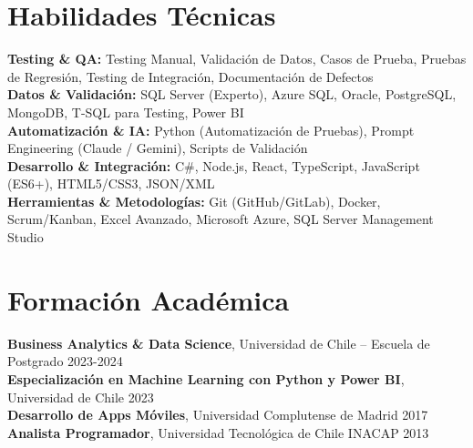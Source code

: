 \documentclass[11pt,letterpaper]{article}
\begin{document}
\section{Habilidades T\'{e}cnicas}
\textbf{Testing \& QA:} Testing Manual, Validación de Datos, Casos de Prueba, Pruebas de Regresión, Testing de Integración, Documentación de Defectos \\
\textbf{Datos \& Validación:} SQL Server (Experto), Azure SQL, Oracle, PostgreSQL, MongoDB, T-SQL para Testing, Power BI \\
\textbf{Automatización \& IA:} Python (Automatización de Pruebas), Prompt Engineering (Claude / Gemini), Scripts de Validación \\
\textbf{Desarrollo \& Integración:} C\#, Node.js, React, TypeScript, JavaScript (ES6+), HTML5/CSS3, JSON/XML \\
\textbf{Herramientas \& Metodologías:} Git (GitHub/GitLab), Docker, Scrum/Kanban, Excel Avanzado, Microsoft Azure, SQL Server Management Studio

\section{Formaci\'{o}n Acad\'{e}mica}
\textbf{Business Analytics \& Data Science}, Universidad de Chile – Escuela de Postgrado \hfill 2023-2024 \\
\textbf{Especialización en Machine Learning con Python y Power BI}, Universidad de Chile \hfill 2023 \\
\textbf{Desarrollo de Apps Móviles}, Universidad Complutense de Madrid \hfill 2017 \\
\textbf{Analista Programador}, Universidad Tecnológica de Chile INACAP \hfill 2013
\end{document}
